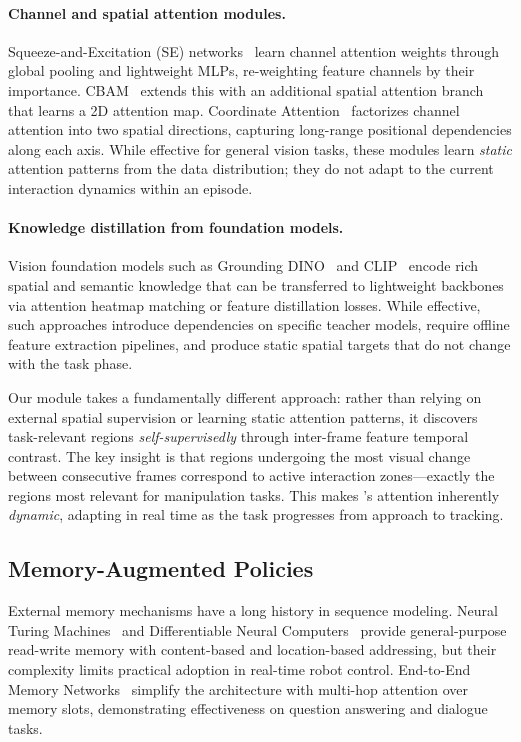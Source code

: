 \paragraph{Channel and spatial attention modules.} Squeeze-and-Excitation (SE) networks~\cite{hu2018squeeze} learn channel attention weights through global pooling and lightweight MLPs, re-weighting feature channels by their importance. CBAM~\cite{woo2018cbam} extends this with an additional spatial attention branch that learns a 2D attention map. Coordinate Attention~\cite{hou2021coordinate} factorizes channel attention into two spatial directions, capturing long-range positional dependencies along each axis. While effective for general vision tasks, these modules learn \emph{static} attention patterns from the data distribution; they do not adapt to the current interaction dynamics within an episode.

\paragraph{Knowledge distillation from foundation models.} Vision foundation models such as Grounding DINO~\cite{liu2023grounding} and CLIP~\cite{radford2021learning} encode rich spatial and semantic knowledge that can be transferred to lightweight backbones via attention heatmap matching or feature distillation losses. While effective, such approaches introduce dependencies on specific teacher models, require offline feature extraction pipelines, and produce static spatial targets that do not change with the task phase.

Our \fasa{} module takes a fundamentally different approach: rather than relying on external spatial supervision or learning static attention patterns, it discovers task-relevant regions \emph{self-supervisedly} through inter-frame feature temporal contrast. The key insight is that regions undergoing the most visual change between consecutive frames correspond to active interaction zones---exactly the regions most relevant for manipulation tasks. This makes \fasa{}'s attention inherently \emph{dynamic}, adapting in real time as the task progresses from approach to tracking.

\subsection{Memory-Augmented Policies}

External memory mechanisms have a long history in sequence modeling. Neural Turing Machines~\cite{graves2014neural} and Differentiable Neural Computers~\cite{graves2016hybrid} provide general-purpose read-write memory with content-based and location-based addressing, but their complexity limits practical adoption in real-time robot control. End-to-End Memory Networks~\cite{sukhbaatar2015end} simplify the architecture with multi-hop attention over memory slots, demonstrating effectiveness on question answering and dialogue tasks.

